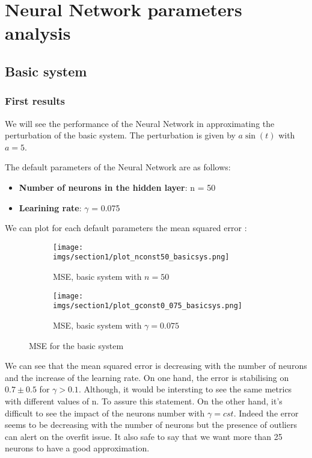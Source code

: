 \chapter{Neural Network parameters analysis}
\section{Basic system}
\subsection{First results}

We will see the performance of the Neural Network in approximating the perturbation %
of the basic system. The perturbation is given by \( a \sin(t) \) with \( a = 5 \). %

The default parameters of the Neural Network are as follows:
\begin{itemize}
    \item \textbf{Number of neurons in the hidden layer}: n = 50
    \item \textbf{Learining rate}: \(\gamma\) = 0.075
\end{itemize}

We can plot for each default parameters the mean squared error : 

\begin{figure}[htbp]
    \centering
    \begin{subfigure}{0.49\textwidth}
        \centering
        \texttt{[image: imgs/section1/plot\_nconst50\_basicsys.png]}
        \caption{MSE, basic system with \(n = 50\)}
        \label{fig:plot_nconst50_basicsys}
    \end{subfigure}
    \hfill
    \begin{subfigure}{0.49\textwidth}
        \centering
        \texttt{[image: imgs/section1/plot\_gconst0\_075\_basicsys.png]}
        \caption{MSE, basic system with \(\gamma = 0.075\)}
        \label{fig:plot_gammconst075_basicsys}
    \end{subfigure}
    \caption{MSE for the basic system}
    \label{fig:double_plot_basicsys}
\end{figure}

We can see that the mean squared error is decreasing with the number of neurons and the increase %
of the learning rate. On one hand, the error is stabilising on \(0.7 \pm 0.5\) for \(\gamma > 0.1\). %
Although, it would be intersting to see the same metrics with different values of n. To %
assure this statement. On the other hand, it's difficult to see the impact of the %
neurons number with \(\gamma = cst\). Indeed the error seems to be decreasing with %
the number of neurons but the presence of outliers can alert on the overfit issue. %
It also safe to say that we want more than 25 neurons to have a good approximation. %

